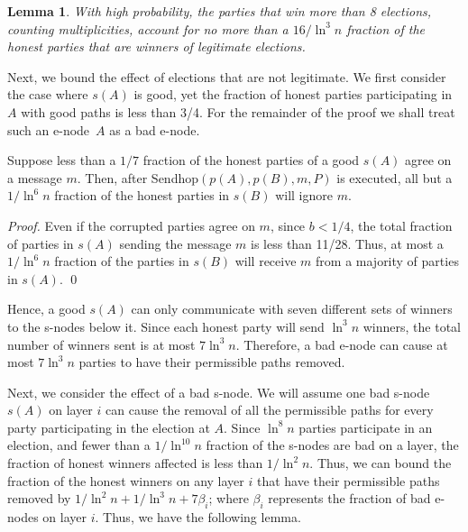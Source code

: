 \documentclass[11pt,letter]{article}
\theoremstyle{mytheoremstyle}
\newtheorem{lemma}{Lemma}
\newcommand{\Sendhop}{\textsf{Sendhop}}
\newcounter{claimcounter}
\newenvironment{claim}{\stepcounter{claimcounter}{\vspace{0.5em}\noindent \textit{Claim \theclaimcounter.~}}}{}
\begin{document}
\begin{lemma}
	With high probability, the parties that win more than 8 elections, counting multiplicities, account for no more than a $16/\ln^3 n$ fraction of the honest parties that are winners of legitimate elections.
\end{lemma}

Next, we bound the effect of elections that are not legitimate. We first consider the case where $s(A)$ is good, yet the fraction of honest parties participating in $A$ with good paths is less than 3/4. For the remainder of the proof we shall treat such an \textsf{e-node}\  $A$ as a bad \textsf{e-node}.

\begin{claim}
	\label{c:bad election}
	Suppose less than a $1/7$ fraction of the honest parties of a good $s(A)$ agree on a message $m$. Then, after
	\Sendhop$(p(A),p(B), m, P)$ is executed, all but a $1/\ln^{6} n $ fraction of the honest parties in $s(B)$ will ignore $m$.
\end{claim}

\noindent\begin{proof}
	Even if the corrupted parties agree on $m$, since $b <1/4$, the total fraction of parties in $s(A)$ sending the message $m$ is less than 11/28. Thus, at most a $1/\ln^{6} n$ fraction of the parties in $s(B)$ will receive $m$ from a majority of parties in $s(A)$.
	\qed
\end{proof}

Hence, a good $s(A)$ can only communicate with seven different sets of winners to the \textsf{s-node}s below it. Since each honest party will send $\ln^3 n$ winners, the total number of winners sent is at most $7 \ln^3 n$. Therefore, a bad \textsf{e-node} can cause at most $7
\ln^3 n$ parties to have their permissible paths removed.

Next, we consider the effect of a bad \textsf{s-node}. We will assume one bad \textsf{s-node} $s(A)$ on layer $i$ can cause the removal of all the permissible paths for every party participating in the election at $A$. Since $\ln^8 n$ parties participate in an election, and fewer than a $1/\ln^{10} n$ fraction of the \textsf{s-node}s are bad on a layer, the fraction of honest winners affected is less than $1/\ln^2 n$. Thus, we can bound the fraction of the honest winners on any layer $i$ that have their permissible paths removed by $1/\ln ^2 n+ 1/\ln^3 n + 7\beta_{i}$; where $\beta_{i}$ represents the fraction of bad \textsf{e-node}s on layer $i$.
Thus, we have the following lemma.
\end{document}
